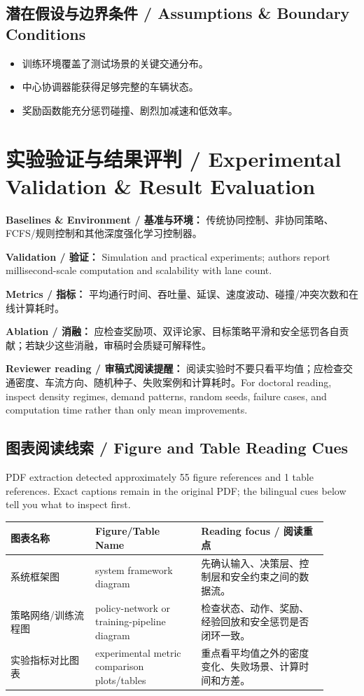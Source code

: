\documentclass[UTF8,a4paper,11pt,fontset=fandol]{ctexart}
\begin{document}
\subsection{潜在假设与边界条件 / Assumptions \& Boundary Conditions}
\begin{itemize}
\item 训练环境覆盖了测试场景的关键交通分布。
\item 中心协调器能获得足够完整的车辆状态。
\item 奖励函数能充分惩罚碰撞、剧烈加减速和低效率。
\end{itemize}


\section{实验验证与结果评判 / Experimental Validation \& Result Evaluation}
\textbf{Baselines \& Environment / 基准与环境：} 传统协同控制、非协同策略、FCFS/规则控制和其他深度强化学习控制器。

\textbf{Validation / 验证：} Simulation and practical experiments; authors report millisecond-scale computation and scalability with lane count.

\textbf{Metrics / 指标：} 平均通行时间、吞吐量、延误、速度波动、碰撞/冲突次数和在线计算耗时。

\textbf{Ablation / 消融：} 应检查奖励项、双评论家、目标策略平滑和安全惩罚各自贡献；若缺少这些消融，审稿时会质疑可解释性。

\textbf{Reviewer reading / 审稿式阅读提醒：} 阅读实验时不要只看平均值；应检查交通密度、车流方向、随机种子、失败案例和计算耗时。For doctoral reading, inspect density regimes, demand patterns, random seeds, failure cases, and computation time rather than only mean improvements.

\subsection{图表阅读线索 / Figure and Table Reading Cues}
PDF extraction detected approximately 55 figure references and 1 table references. Exact captions remain in the original PDF; the bilingual cues below tell you what to inspect first.

\begin{longtable}{p{0.24\linewidth}p{0.30\linewidth}p{0.36\linewidth}}
\toprule
图表名称 & Figure/Table Name & Reading focus / 阅读重点\\
\midrule
系统框架图 & system framework diagram & 先确认输入、决策层、控制层和安全约束之间的数据流。 \\
策略网络/训练流程图 & policy-network or training-pipeline diagram & 检查状态、动作、奖励、经验回放和安全惩罚是否闭环一致。 \\
实验指标对比图表 & experimental metric comparison plots/tables & 重点看平均值之外的密度变化、失败场景、计算时间和方差。 \\
\bottomrule
\end{longtable}
\end{document}
